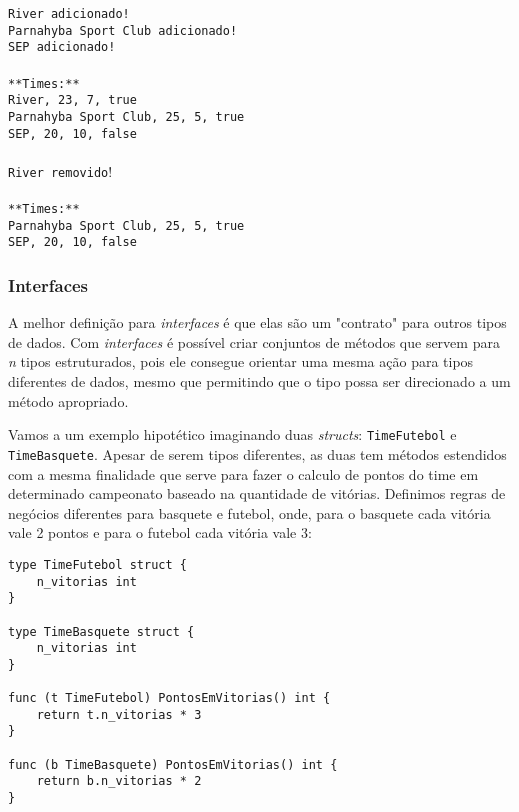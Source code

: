 \documentclass{SBCbookchapter}
\begin{document}
\noindent\texttt{River adicionado!}\\
\texttt{Parnahyba Sport Club adicionado!}\\
\texttt{SEP adicionado!}\\ \\
\texttt{**Times:**}\\
\texttt{River, 23, 7, true}\\
\texttt{Parnahyba Sport Club, 25, 5, true}\\
\texttt{SEP, 20, 10, false}\\ \\
\texttt{River removido}!\\ \\
\texttt{**Times:**}\\
\texttt{Parnahyba Sport Club, 25, 5, true}\\
\texttt{SEP, 20, 10, false}\\

\subsubsection{Interfaces}

A melhor definição para \textit{interfaces} é que elas são um "contrato" para outros tipos de dados. Com \textit{interfaces} é possível criar conjuntos de métodos que servem para \textit{n} tipos estruturados, pois ele consegue orientar uma mesma ação para tipos diferentes de dados, mesmo que permitindo que o tipo possa ser direcionado a um método apropriado.

Vamos a um exemplo hipotético imaginando duas \textit{structs}: \texttt{TimeFutebol} e \texttt{TimeBasquete}. Apesar de serem tipos diferentes, as duas tem métodos estendidos com a mesma finalidade que serve para fazer o calculo de pontos do time em determinado campeonato baseado na quantidade de vitórias. Definimos regras de negócios diferentes para basquete e futebol, onde, para o basquete cada vitória vale 2 pontos e para o futebol cada vitória vale 3:

\begin{lstlisting}
type TimeFutebol struct {
	n_vitorias int
}

type TimeBasquete struct {
	n_vitorias int
}

func (t TimeFutebol) PontosEmVitorias() int {
	return t.n_vitorias * 3
}

func (b TimeBasquete) PontosEmVitorias() int {
	return b.n_vitorias * 2
}
\end{lstlisting}
\end{document}
